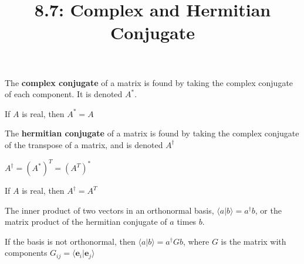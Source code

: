 \documentclass{article}
\title{8.7: Complex and Hermitian Conjugate}
\begin{document}
\maketitle
\begin{definition}
The \textbf{complex conjugate} of a matrix is found by taking the complex conjugate of each component. It is denoted $A^*$.

If $A$ is real, then $A^* = A$
\end{definition}

\begin{definition}
The \textbf{hermitian conjugate} of a matrix is found by taking the complex conjugate of the transpose of a matrix, and is denoted $A^\dagger$

$A^\dagger = (A^*)^T = (A^T)^*$

If $A$ is real, then $A^\dagger = A^T$
\end{definition}

The inner product of two vectors in an orthonormal basis, $\langle a\vert b\rangle = a^\dagger b$, or the matrix product of the hermitian conjugate of $a$ times $b$. 

If the basis is not orthonormal, then $\langle a \vert b \rangle = a^\dagger Gb$, where $G$ is the matrix with components $G_{ij} = \langle \mathbf{e}_i \vert \mathbf{e}_j \rangle$
\end{document}
